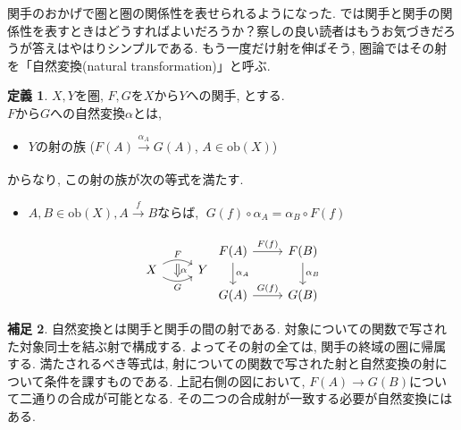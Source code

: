\documentclass[a4paper]{jsarticle}
\theoremstyle{definition}
\newtheorem{dfn}{定義}[section]
\newtheorem{hsk}[dfn]{補足}
\newcommand{\ob}{{\mathrm{ob}}}
\begin{document}
関手のおかげで圏と圏の関係性を表せられるようになった. では関手と関手の関係性を表すときはどうすればよいだろうか？察しの良い読者はもうお気づきだろうが答えはやはりシンプルである. もう一度だけ射を伸ばそう, 圏論ではその射を「自然変換(natural transformation)」と呼ぶ.
\begin{dfn}
    $X, Y$を圏, $F, G$を$X$から$Y$への関手, とする.\\
    $F$から$G$への自然変換$\alpha$とは,
    \begin{itemize}
        \item $Y$の射の族 ($F(A)\xrightarrow[]{\alpha_A} G(A)$, $A\in\ob(X)$)
    \end{itemize}
    からなり, この射の族が次の等式を満たす.
    \begin{itemize}
        \item $A, B\in\ob(X), A\xrightarrow[]{f}B$ならば, $\; G(f)\circ \alpha_A = \alpha_B\circ F(f)$
    \end{itemize}
\end{dfn}
\begin{equation}
\begin{tikzcd}
X
\arrow[r, bend left, "F"]
\arrow[r, bend right, swap, "G"]
\arrow[r, phantom, bend left, shift right=0.2ex, ""{name=U}]
\arrow[r, phantom, bend right, shift left=0.2ex, swap, ""{name=D}]
&Y
\arrow[Rightarrow, from=U, to=D, "\alpha"]
\end{tikzcd}
     \begin{tikzcd}
        F(A)\arrow{r}{F(f)} \arrow{d}{\alpha_A} & F(B)\arrow{d}{\alpha_B}\\
        G(A)\arrow{r}{G(f)} & G(B)
    \end{tikzcd}
\end{equation}
\begin{hsk}
    自然変換とは関手と関手の間の射である. 対象についての関数で写された対象同士を結ぶ射で構成する. よってその射の全ては, 関手の終域の圏に帰属する. 満たされるべき等式は, 射についての関数で写された射と自然変換の射について条件を課すものである. 上記右側の図において, $F(A)\rightarrow G(B)$について二通りの合成が可能となる. その二つの合成射が一致する必要が自然変換にはある.\\
\end{hsk}
\end{document}

